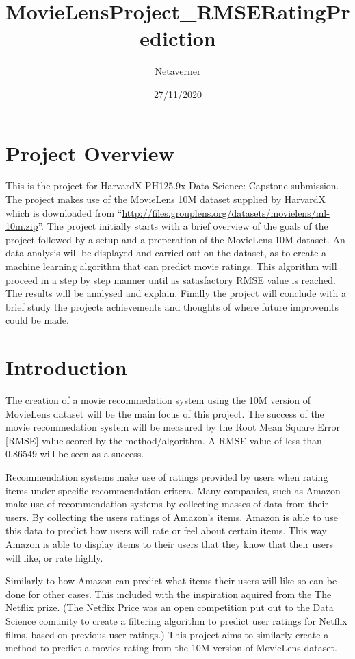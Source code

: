 \documentclass[
]{article}
\title{MovieLensProject\_RMSERatingPrediction}
\author{Netaverner}
\date{27/11/2020}
\begin{document}
\maketitle

\hypertarget{project-overview}{%
\section{Project Overview}\label{project-overview}}

This is the project for HarvardX PH125.9x Data Science: Capstone
submission. The project makes use of the MovieLens 10M dataset supplied
by HarvardX which is downloaded from
``\url{http://files.grouplens.org/datasets/movielens/ml-10m.zip}''. The
project initially starts with a brief overview of the goals of the
project followed by a setup and a preperation of the MovieLens 10M
dataset. An data analysis will be displayed and carried out on the
dataset, as to create a machine learning algorithm that can predict
movie ratings. This algorithm will proceed in a step by step manner
until as satasfactory RMSE value is reached. The results will be
analysed and explain. Finally the project will conclude with a brief
study the projects achievements and thoughts of where future improvemts
could be made.

\hypertarget{introduction}{%
\section{Introduction}\label{introduction}}

The creation of a movie recommedation system using the 10M version of
MovieLens dataset will be the main focus of this project. The success of
the movie recommedation system will be measured by the Root Mean Square
Error {[}RMSE{]} value scored by the method/algorithm. A RMSE value of
less than 0.86549 will be seen as a success.

Recommendation systems make use of ratings provided by users when rating
items under specific recommendation critera. Many companies, such as
Amazon make use of recommendation systems by collecting masses of data
from their users. By collecting the users ratings of Amazon's items,
Amazon is able to use this data to predict how users will rate or feel
about certain items. This way Amazon is able to display items to their
users that they know that their users will like, or rate highly.

Similarly to how Amazon can predict what items their users will like so
can be done for other cases. This included with the inspiration aquired
from the The Netflix prize. (The Netflix Price was an open competition
put out to the Data Science comunity to create a filtering algorithm to
predict user ratings for Netflix films, based on previous user ratings.)
This project aims to similarly create a method to predict a movies
rating from the 10M version of MovieLens dataset.
\end{document}
